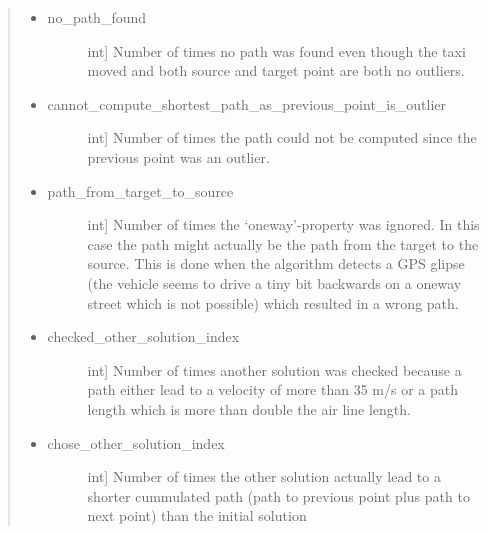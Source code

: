 \documentclass[letterpaper,10pt,english]{sphinxmanual}
\begin{document}
\begin{fulllineitems}
\begin{quote}
\begin{description}
\begin{description}
\begin{itemize}
\item {} \begin{description}
\item[{no\_path\_found}] \leavevmode{[}int{]}
Number of times no path was found even though the taxi moved and both source and target point are both no outliers.

\end{description}

\item {} \begin{description}
\item[{cannot\_compute\_shortest\_path\_as\_previous\_point\_is\_outlier}] \leavevmode{[}int{]}
Number of times the path could not be computed since the previous point was an outlier.

\end{description}

\item {} \begin{description}
\item[{path\_from\_target\_to\_source}] \leavevmode{[}int{]}
Number of times the ‘oneway’-property was ignored. In this case the path might actually be the path from the target to the source. This is done when the algorithm detects a GPS glipse (the vehicle seems to drive a tiny bit backwards on a oneway street which is not possible) which resulted in a wrong path.

\end{description}

\item {} \begin{description}
\item[{checked\_other\_solution\_index}] \leavevmode{[}int{]}
Number of times another solution was checked because a path either lead to a velocity of more than 35 m/s or a path length which is more than double the air line length.

\end{description}

\item {} \begin{description}
\item[{chose\_other\_solution\_index}] \leavevmode{[}int{]}
Number of times the other solution actually lead to a shorter cummulated path (path to previous point plus path to next point) than the initial solution

\end{description}


\end{itemize}
\end{description}
\end{description}
\end{quote}
\end{fulllineitems}
\end{document}
